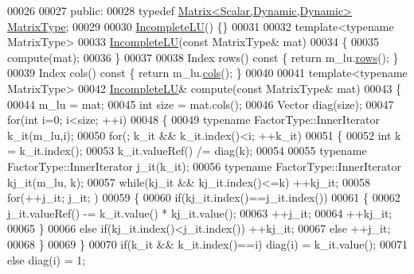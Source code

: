 \begin{DoxyCode}
00026 
00027   \textcolor{keyword}{public}:
00028     \textcolor{keyword}{typedef} \hyperlink{group___core___module}{Matrix<Scalar,Dynamic,Dynamic>} 
      \hyperlink{group___core___module}{MatrixType};
00029 
00030     \hyperlink{class_eigen_1_1_incomplete_l_u}{IncompleteLU}() \{\}
00031 
00032     \textcolor{keyword}{template}<\textcolor{keyword}{typename} MatrixType>
00033     \hyperlink{class_eigen_1_1_incomplete_l_u}{IncompleteLU}(\textcolor{keyword}{const} MatrixType& mat)
00034     \{
00035       compute(mat);
00036     \}
00037 
00038     Index rows()\textcolor{keyword}{ const }\{ \textcolor{keywordflow}{return} m\_lu.\hyperlink{group___sparse_core___module_a62e61bb861eee306d5b069ce652b5aa5}{rows}(); \}
00039     Index cols()\textcolor{keyword}{ const }\{ \textcolor{keywordflow}{return} m\_lu.\hyperlink{group___sparse_core___module_aa391750e3c530227e4a5c3c52e959975}{cols}(); \}
00040 
00041     \textcolor{keyword}{template}<\textcolor{keyword}{typename} MatrixType>
00042     \hyperlink{class_eigen_1_1_incomplete_l_u}{IncompleteLU}& compute(\textcolor{keyword}{const} MatrixType& mat)
00043     \{
00044       m\_lu = mat;
00045       \textcolor{keywordtype}{int} size = mat.cols();
00046       Vector diag(size);
00047       \textcolor{keywordflow}{for}(\textcolor{keywordtype}{int} i=0; i<size; ++i)
00048       \{
00049         \textcolor{keyword}{typename} FactorType::InnerIterator k\_it(m\_lu,i);
00050         \textcolor{keywordflow}{for}(; k\_it && k\_it.index()<i; ++k\_it)
00051         \{
00052           \textcolor{keywordtype}{int} k = k\_it.index();
00053           k\_it.valueRef() /= diag(k);
00054 
00055           \textcolor{keyword}{typename} FactorType::InnerIterator j\_it(k\_it);
00056           \textcolor{keyword}{typename} FactorType::InnerIterator kj\_it(m\_lu, k);
00057           \textcolor{keywordflow}{while}(kj\_it && kj\_it.index()<=k) ++kj\_it;
00058           \textcolor{keywordflow}{for}(++j\_it; j\_it; )
00059           \{
00060             \textcolor{keywordflow}{if}(kj\_it.index()==j\_it.index())
00061             \{
00062               j\_it.valueRef() -= k\_it.value() * kj\_it.value();
00063               ++j\_it;
00064               ++kj\_it;
00065             \}
00066             \textcolor{keywordflow}{else} \textcolor{keywordflow}{if}(kj\_it.index()<j\_it.index()) ++kj\_it;
00067             \textcolor{keywordflow}{else}                                ++j\_it;
00068           \}
00069         \}
00070         \textcolor{keywordflow}{if}(k\_it && k\_it.index()==i) diag(i) = k\_it.value();
00071         \textcolor{keywordflow}{else}                        diag(i) = 1;

\end{DoxyCode}
